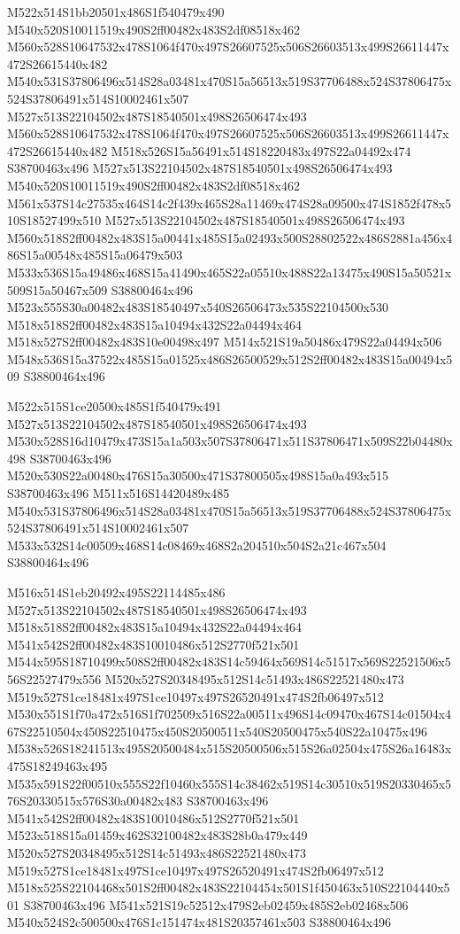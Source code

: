 \documentclass{article}
\begin{document}
\begin{multicols}{2}
M522x514S1bb20501x486S1f540479x490 M540x520S10011519x490S2ff00482x483S2df08518x462 M560x528S10647532x478S1064f470x497S26607525x506S26603513x499S26611447x472S26615440x482 M540x531S37806496x514S28a03481x470S15a56513x519S37706488x524S37806475x524S37806491x514S10002461x507 M527x513S22104502x487S18540501x498S26506474x493 M560x528S10647532x478S1064f470x497S26607525x506S26603513x499S26611447x472S26615440x482 M518x526S15a56491x514S18220483x497S22a04492x474 S38700463x496 M527x513S22104502x487S18540501x498S26506474x493 M540x520S10011519x490S2ff00482x483S2df08518x462 M561x537S14c27535x464S14c2f439x465S28a11469x474S28a09500x474S1852f478x510S18527499x510 M527x513S22104502x487S18540501x498S26506474x493 M560x518S2ff00482x483S15a00441x485S15a02493x500S28802522x486S2881a456x486S15a00548x485S15a06479x503 M533x536S15a49486x468S15a41490x465S22a05510x488S22a13475x490S15a50521x509S15a50467x509 S38800464x496 M523x555S30a00482x483S18540497x540S26506473x535S22104500x530 M518x518S2ff00482x483S15a10494x432S22a04494x464 M518x527S2ff00482x483S10e00498x497 M514x521S19a50486x479S22a04494x506 M548x536S15a37522x485S15a01525x486S26500529x512S2ff00482x483S15a00494x509 S38800464x496

M522x515S1ce20500x485S1f540479x491 M527x513S22104502x487S18540501x498S26506474x493 M530x528S16d10479x473S15a1a503x507S37806471x511S37806471x509S22b04480x498 S38700463x496 M520x530S22a00480x476S15a30500x471S37800505x498S15a0a493x515 S38700463x496 M511x516S14420489x485 M540x531S37806496x514S28a03481x470S15a56513x519S37706488x524S37806475x524S37806491x514S10002461x507 M533x532S14c00509x468S14c08469x468S2a204510x504S2a21c467x504 S38800464x496

M516x514S1eb20492x495S22114485x486 M527x513S22104502x487S18540501x498S26506474x493 M518x518S2ff00482x483S15a10494x432S22a04494x464 M541x542S2ff00482x483S10010486x512S2770f521x501 M544x595S18710499x508S2ff00482x483S14c59464x569S14c51517x569S22521506x556S22527479x556 M520x527S20348495x512S14c51493x486S22521480x473 M519x527S1ce18481x497S1ce10497x497S26520491x474S2fb06497x512 M530x551S1f70a472x516S1f702509x516S22a00511x496S14c09470x467S14c01504x467S22510504x450S22510475x450S20500511x540S20500475x540S22a10475x496 M538x526S18241513x495S20500484x515S20500506x515S26a02504x475S26a16483x475S18249463x495 M535x591S22f00510x555S22f10460x555S14c38462x519S14c30510x519S20330465x576S20330515x576S30a00482x483 S38700463x496 M541x542S2ff00482x483S10010486x512S2770f521x501 M523x518S15a01459x462S32100482x483S28b0a479x449 M520x527S20348495x512S14c51493x486S22521480x473 M519x527S1ce18481x497S1ce10497x497S26520491x474S2fb06497x512 M518x525S22104468x501S2ff00482x483S22104454x501S1f450463x510S22104440x501 S38700463x496 M541x521S19c52512x479S2eb02459x485S2eb02468x506 M540x524S2c500500x476S1c151474x481S20357461x503 S38800464x496


\end{multicols}
\end{document}
